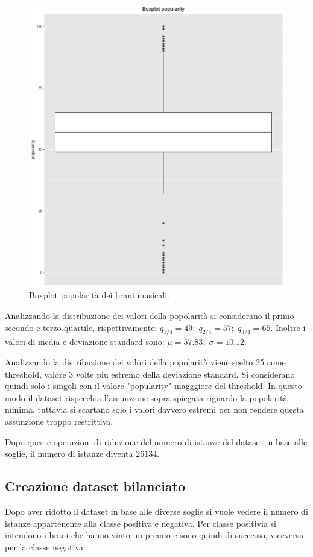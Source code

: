 \begin{figure}[H]
\centering
\includegraphics[width=14cm]{../images/popularity_boxplot.png}
\caption{Boxplot popolarità dei brani musicali.}
\end{figure}

Analizzando la distribuzione dei valori della popolarità si considerano il primo secondo e terzo quartile, rispettivamente: $q_{1/4} = 49; \; q_{2/4}= 57; \; q_{3/4} = 65$. Inoltre i valori di media e deviazione standard sono: $\mu = 57.83; \; \sigma = 10.12$.

Analizzando la distribuzione dei valori della popolarità viene scelto 25 come threshold, valore 3 volte più estremo della deviazione standard. Si considerano quindi solo i singoli con il valore "popularity" magggiore del threshold. In questo modo il dataset rispecchia l'assunzione sopra spiegata riguardo la popolarità minima, tuttavia si scartano solo i valori davvero estremi per non rendere questa assunzione troppo restrittiva.

Dopo queste operazioni di riduzione del numero di istanze del dataset in base alle soglie, il numero di istanze diventa $26134$.


\subsection{Creazione dataset bilanciato}
Dopo aver ridotto il dataset in base alle diverse soglie si vuole vedere il numero di istanze appartenente alla classe positiva e negativa. Per classe positivia si intendono i brani che hanno vinto un premio e sono quindi di successo, viceversa per la classe negativa.

